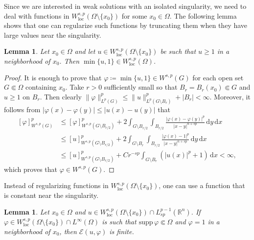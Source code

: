 \documentclass[11pt]{amsart}
\theoremstyle{plain}
\newtheorem{lemma}[theorem]{Lemma}
\theoremstyle{definition}
\numberwithin{equation}{section}
\begin{document}
Since we are interested in weak solutions with an isolated singularity, we need to deal with functions in $W^{s, p}_{\mathrm{loc}}(\Omega \setminus \{x_0\})$ for some $x_0 \in \Omega$. The following lemma shows that one can regularize such functions by truncating them when they have large values near the singularity.

\begin{lemma}\label{lem-test-trunc}
Let $x_0 \in \Omega$ and let $u \in W^{s, p}_{\mathrm{loc}}(\Omega \setminus \{x_0\})$ be such that $u \geq 1$ in a neighborhood of $x_0$. Then $\min\{u, 1\} \in W^{s, p}_{\mathrm{loc}}(\Omega)$.
\end{lemma}

\begin{proof}
It is enough to prove that $\varphi\coloneqq\min\{u, 1\} \in W^{s, p}(G)$ for each open set $G \Subset \Omega$ containing $x_0$. Take $r>0$ sufficiently small so that $B_r=B_r(x_0) \Subset G$ and $u \geq 1$ on $B_r$. Then clearly $\|\varphi\|_{L^p(G)}^p \leq \|u\|_{L^p(G\setminus B_r)}^p + |B_r|<\infty$. Moreover, it follows from $|\varphi(x)-\varphi(y)|\leq |u(x)-u(y)|$ that
\begin{equation*}
\begin{split}
[\varphi]_{W^{s, p}(G)}^p
&\leq [\varphi]_{W^{s, p}(G \setminus B_{r/2})}^p + 2\int_{G \setminus B_{r/2}} \int_{B_{r/2}} \frac{|\varphi(x)-\varphi(y)|^p}{|x-y|^{n+sp}} \,\mathrm{d}y\,\mathrm{d}x \\
&\leq [u]_{W^{s, p}(G \setminus B_{r/2})}^p + 2\int_{G \setminus B_r} \int_{B_{r/2}} \frac{|\varphi(x)-1|^p}{|x-y|^{n+sp}} \,\mathrm{d}y\,\mathrm{d}x \\
&\leq [u]_{W^{s, p}(G \setminus B_{r/2})}^p + Cr^{-sp} \int_{G \setminus B_r} (|u(x)|^p+1) \,\mathrm{d}x < \infty,
\end{split}
\end{equation*}
which proves that $\varphi \in W^{s, p}(G)$.
\end{proof}

Instead of regularizing functions in $W^{s, p}_{\mathrm{loc}}(\Omega \setminus \{x_0\})$, one can use a function that is constant near the singularity.

\begin{lemma}\label{lem-test-const}
Let $x_0 \in \Omega$ and $u \in W^{s, p}_{\mathrm{loc}}(\Omega \setminus \{x_0\}) \cap L^{p-1}_{sp}(\mathbb{R}^n)$. If $\varphi \in W^{s, p}_{\mathrm{loc}}(\Omega \setminus \{x_0\}) \cap L^\infty(\Omega)$ is such that $\mathrm{supp}\,{\varphi} \Subset \Omega$ and $\varphi=1$ in a neighborhood of $x_0$, then $\mathcal{E}(u, \varphi)$ is finite.
\end{lemma}
\end{document}
